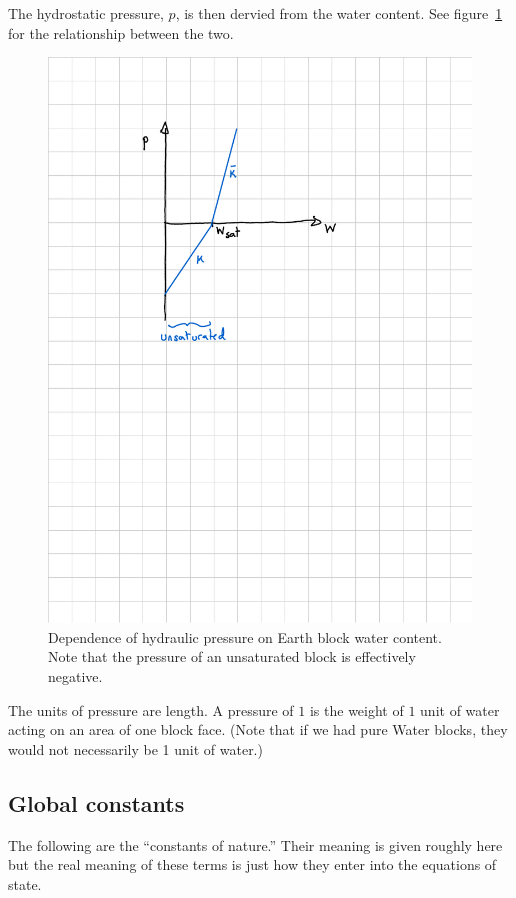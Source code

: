 \documentclass[10pt, a4paper, twocolumn]{article}
\begin{document}
The hydrostatic pressure, $p$, is then dervied from the water
content. See figure~\ref{fig:pressure} for the relationship between
the two.
\begin{figure}[ht]
  \centering
  \includegraphics{fig-pressure.pdf}
  \caption{Dependence of hydraulic pressure on Earth block water
    content. Note that the pressure of an unsaturated block is
    effectively negative.}
  \label{fig:pressure}
\end{figure}

The units of pressure are length. A pressure of $1$ is the weight of
$1$ unit of water acting on an area of one block face. (Note that if
we had pure Water blocks, they would not necessarily be 1 unit of
water.)

\subsection{Global constants}

The following are the ``constants of nature.'' Their meaning is given
roughly here but the real meaning of these terms is just how they
enter into the equations of state.
\end{document}
